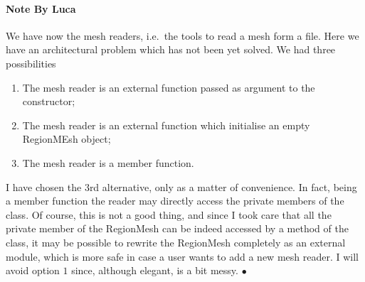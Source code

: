 \paragraph{Note By Luca}
We have now the mesh readers, i.e.\  the tools to read a mesh form a file.
Here we have an architectural problem which has not been yet solved.
We had three possibilities
\begin{enumerate}
\item The mesh reader is an external function passed as argument to the 
constructor;
\item The mesh reader is an external function which initialise an empty RegionMEsh object;
\item The mesh reader is a member function.
\end{enumerate}
I have chosen the 3rd alternative, only as a matter of convenience. In
fact, being a member function the reader may directly access the
private members of the class. Of course, this is not a good thing, and
since I took care that all the private member of the RegionMesh can be
indeed accessed by a method of the class, it may be possible to
rewrite the RegionMesh completely as an external module, which is more
safe in case a user wants to add a new mesh reader. I will avoid option $1$
since, although elegant, is a bit messy. $\bullet$

